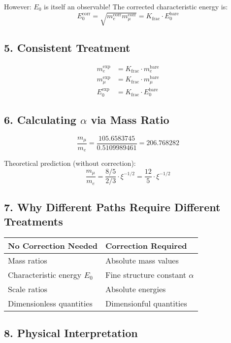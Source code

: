 \documentclass[12pt,a4paper]{article}
\begin{document}
	However: $E_0$ is itself an observable! The corrected characteristic energy is:
	\[
	E_0^{\text{corr}} = \sqrt{m_e^{\text{corr}} m_\mu^{\text{corr}}} = K_{\text{frac}} \cdot E_0^{\text{bare}}
	\]
	
	\subsection*{5. Consistent Treatment}
	
	\begin{align*}
		m_e^{\text{exp}} &= K_{\text{frac}} \cdot m_e^{\text{bare}} \\
		m_\mu^{\text{exp}} &= K_{\text{frac}} \cdot m_\mu^{\text{bare}} \\
		E_0^{\text{exp}} &= K_{\text{frac}} \cdot E_0^{\text{bare}}
	\end{align*}
	
	\subsection*{6. Calculating $\alpha$ via Mass Ratio}
	
	\[
	\frac{m_\mu}{m_e} = \frac{105.6583745}{0.5109989461} = 206.768282
	\]
	
	Theoretical prediction (without correction):
	\[
	\frac{m_\mu}{m_e} = \frac{8/5}{2/3} \cdot \xi^{-1/2} = \frac{12}{5} \cdot \xi^{-1/2}
	\]
	
	\subsection*{7. Why Different Paths Require Different Treatments}
	
	\begin{tabular}{p{}p{}}
		\textbf{No Correction Needed} & \textbf{Correction Required} \\
		\hline
		Mass ratios & Absolute mass values \\
		Characteristic energy $E_0$ & Fine structure constant $\alpha$ \\
		Scale ratios & Absolute energies \\
		Dimensionless quantities & Dimensionful quantities \\
	\end{tabular}
	
	\subsection*{8. Physical Interpretation}
	
\end{document}
